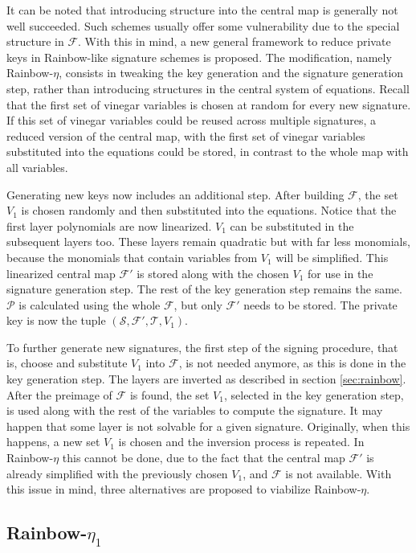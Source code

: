 \documentclass{ufsctex/ufsctex}
\begin{document}
It can be noted that introducing structure into the central map is generally
not well succeeded. Such schemes usually offer some vulnerability due to the
special structure in $\mathcal{F}$. With this in mind, a new general framework
to reduce private keys in Rainbow-like signature schemes is proposed. The
modification, namely Rainbow-$\eta$, consists in tweaking the key generation
and the signature generation step, rather than introducing structures in the
central system of equations. Recall that the first set of vinegar variables is
chosen at random for every new signature. If this set of vinegar variables
could be reused across multiple signatures, a reduced version of the central
map, with the first set of vinegar variables substituted into the equations
could be stored, in contrast to the whole map with all variables.

Generating new keys now includes an additional step. After building
$\mathcal{F}$, the set $V_1$ is chosen randomly and then substituted into the
equations. Notice that the first layer polynomials are now linearized. $V_1$
can be substituted in the subsequent layers too. These layers remain quadratic
but with far less monomials, because the monomials that contain variables from
$V_1$ will be simplified. This linearized central map $\mathcal{F'}$ is stored
along with the chosen $V_1$ for use in the signature generation step.  The rest
of the key generation step remains the same. $\mathcal{P}$ is calculated using
the whole $\mathcal{F}$, but only $\mathcal{F'}$ needs to be stored. The
private key is now the tuple $(\mathcal{S}, \mathcal{F'}, \mathcal{T}, V_1)$.

To further generate new signatures, the first step of the signing procedure,
that is, choose and substitute $V_1$ into $\mathcal{F}$, is not needed anymore,
as this is done in the key generation step. The layers are inverted as
described in section \ref{sec:rainbow}. After the preimage of $\mathcal{F}$ is
found, the set $V_1$, selected in the key generation step, is used along with
the rest of the variables to compute the signature. It may happen that some
layer is not solvable for a given signature. Originally, when this happens, a
new set $V_1$ is chosen and the inversion process is repeated. In
Rainbow-$\eta$ this cannot be done, due to the fact that the central map
$\mathcal{F'}$ is already simplified with the previously chosen $V_1$, and
$\mathcal{F}$ is not available. With this issue in mind, three alternatives are
proposed to viabilize Rainbow-$\eta$.

\subsection{Rainbow-$\eta_1$}
\end{document}
